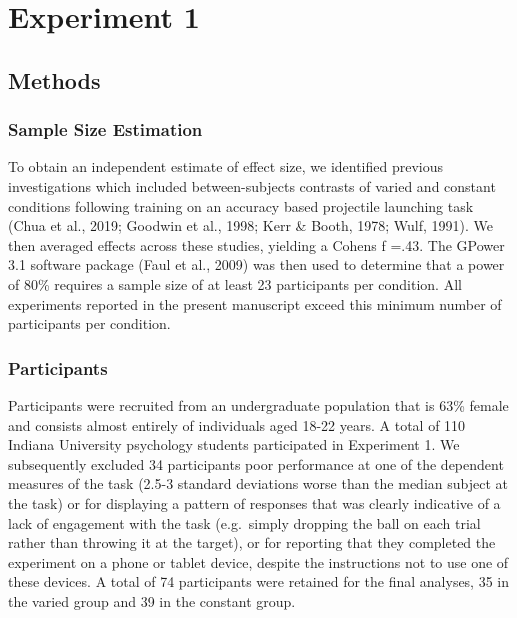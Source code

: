 \documentclass[
  jou, donotrepeattitle,floatsintext]{apa7}
\begin{document}
\hypertarget{experiment-1}{%
\section{Experiment 1}\label{experiment-1}}

\hypertarget{methods}{%
\subsection{Methods}\label{methods}}

\hypertarget{sample-size-estimation}{%
\subsubsection{Sample Size Estimation}\label{sample-size-estimation}}

To obtain an independent estimate of effect size, we identified previous investigations which included between-subjects contrasts of varied and constant conditions following training on an accuracy based projectile launching task (Chua et al., 2019; Goodwin et al., 1998; Kerr \& Booth, 1978; Wulf, 1991). We then averaged effects across these studies, yielding a Cohens f =.43. The GPower 3.1 software package (Faul et al., 2009) was then used to determine that a power of 80\% requires a sample size of at least 23 participants per condition. All experiments reported in the present manuscript exceed this minimum number of participants per condition.

\hypertarget{participants}{%
\subsubsection{Participants}\label{participants}}

Participants were recruited from an undergraduate population that is 63\% female and consists almost entirely of individuals aged 18-22 years. A total of 110 Indiana University psychology students participated in Experiment 1. We subsequently excluded 34 participants poor performance at one of the dependent measures of the task (2.5-3 standard deviations worse than the median subject at the task) or for displaying a pattern of responses that was clearly indicative of a lack of engagement with the task (e.g.~simply dropping the ball on each trial rather than throwing it at the target), or for reporting that they completed the experiment on a phone or tablet device, despite the instructions not to use one of these devices. A total of 74 participants were retained for the final analyses, 35 in the varied group and 39 in the constant group.
\end{document}
